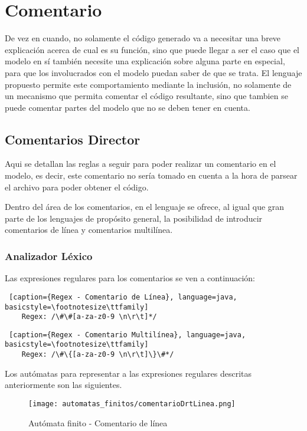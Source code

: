 \section{Comentario}
\label{sec:comentario}
De vez en cuando, no solamente el código generado va a necesitar una breve
explicación acerca de cual es su función, sino que puede llegar a ser el caso
que el modelo en sí también necesite una explicación sobre alguna parte en
especial, para que los involucrados con el modelo puedan saber de que se trata.
El lenguaje propuesto permite este comportamiento mediante la inclusión, no
solamente de un mecanismo que permita comentar el código resultante, sino que
tambien se puede comentar partes del modelo que no se deben tener en cuenta.

\subsection{Comentarios Director}
\label{sub:comentariosdrt}
Aqui se detallan las reglas a seguir para poder realizar un comentario en el
modelo, es decir, este comentario no sería tomado en cuenta a la hora de
parsear el archivo para poder obtener el código.

Dentro del área de los comentarios, en el lenguaje se ofrece, al igual que gran
parte de los lenguajes de propósito general, la posibilidad de introducir
comentarios de línea y comentarios multilínea.

\subsubsection{Analizador Léxico}

Las expresiones regulares para los comentarios se ven a continuación:

\begin{lstlisting} [caption={Regex - Comentario de Línea}, language=java, basicstyle=\footnotesize\ttfamily]
	Regex: /\#\#[a-za-z0-9 \n\r\t]*/
\end{lstlisting}

\begin{lstlisting} [caption={Regex - Comentario Multilínea}, language=java, basicstyle=\footnotesize\ttfamily]
	Regex: /\#\{[a-za-z0-9 \n\r\t]\}\#*/
\end{lstlisting}

Los autómatas para representar a las expresiones regulares descritas
anteriormente son las siguientes.

\begin{figure}[H]
	\centering
	\texttt{[image: automatas\_finitos/comentarioDrtLinea.png]}
	\caption{Autómata finito - Comentario de línea}
	\label{fig:af_com_linea}
\end{figure}

